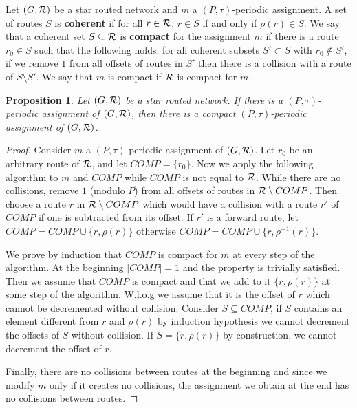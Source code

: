 \documentclass[10pt, conference, letterpaper]{IEEEtran}
\newtheorem{proposition}{Proposition}
\begin{document}
Let $(G, {\cal R})$ be a star routed network and $m$ a $(P,\tau)$-periodic assignment.
A set of routes $S$ is \textbf{coherent} if for all $r \in {\cal R}$, $r \in S$ if and only if $\rho(r) \in S$. We say that a coherent set $S \subseteq {\cal R}$ is \textbf{compact} for the assignment $m$ if there is a route $r_0 \in S$ such that the following holds:  
for all coherent subsets $S'\subset S$ with $r_0 \notin S'$, if we remove $1$ from all offsets of routes in $S'$ then there is a collision with a route of $S \setminus S'$. We say that $m$ is compact if ${\cal R}$ is compact for $m$. 
% 
% 

\begin{proposition}
Let $(G, {\cal R})$ be a star routed network. If there is a $(P,\tau)$-periodic assignment of $(G, {\cal R})$, then there is a compact $(P,\tau)$-periodic assignment of $(G, {\cal R})$.
\end{proposition}
\begin{proof}
Consider $m$ a $(P,\tau)$-periodic assignment of $(G, {\cal R})$.
Let $r_0$ be an arbitrary route of ${\cal R}$,  and let $COMP = \{r_0\}$. Now we apply the following algorithm to $m$ and $COMP$ while $COMP$ is not equal to ${\cal R}$.
While there are no collisions, remove $1$ (modulo $P$) from all offsets of routes in ${\cal R} \setminus COMP$. Then choose a route $r$ in ${\cal R} \setminus COMP$ which would have a collision with a route $r'$ of $COMP$ if one is subtracted from its offset. If $r'$ is a forward route, let $COMP = COMP \cup \{r, \rho(r)\}$ otherwise  $COMP = COMP \cup \{r, \rho^{-1}(r)\}$. 

We prove by induction that $COMP$ is compact for $m$ at every step of the algorithm.
At the beginning $|COMP| = 1$ and the property is trivially satisfied. Then we assume that 
$COMP$ is compact and that we add to it $\{r, \rho(r)\}$ at some step of the algorithm. W.l.o.g we assume that it is the offset of $r$ which cannot be decremented without collision. Consider $S \subseteq   COMP$, if $S$ contains an element different from $r$ and $\rho(r)$ by induction hypothesis we cannot decrement the offsets of $S$ without collision. If $S =\{r, \rho(r)\}$
by construction, we cannot decrement the offset of $r$. 

Finally, there are no collisions between routes at the beginning and since we modify $m$ only if it creates no collisions, the assignment we obtain at the end has no collisions between routes.
\end{proof}
\end{document}

